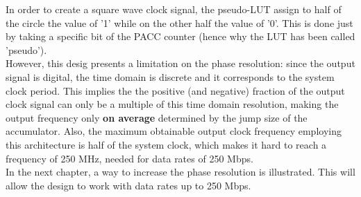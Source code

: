 \documentclass[11pt]{article}
\renewcommand{\>}{\rangle} \renewcommand{\emptyset}{\varnothing}
\begin{document}
In order to create a square wave clock signal, the pseudo-LUT assign to half of
the circle the value of '1' while on the other half the value of '0'. This is
done just by taking a specific bit of the PACC counter (hence why the LUT has
been called 'pseudo').\\
However, this desig presents a limitation on the phase resolution: since the
output signal is digital, the time domain is discrete and it corresponds to the
system clock period. This implies the the positive (and negative) fraction of
the output clock signal can only be a multiple of this time domain resolution,
making the output frequency only \textbf{on average} determined by the jump size
of the accumulator. Also, the maximum obtainable output clock frequency
employing this architecture is half of the system clock, which makes it hard to
reach a frequency of 250 MHz, needed for data rates of 250 Mbps.\\
In the next chapter, a way to increase the phase resolution is illustrated. This
will allow the design to work with data rates up to 250 Mbps.\\
\end{document}

